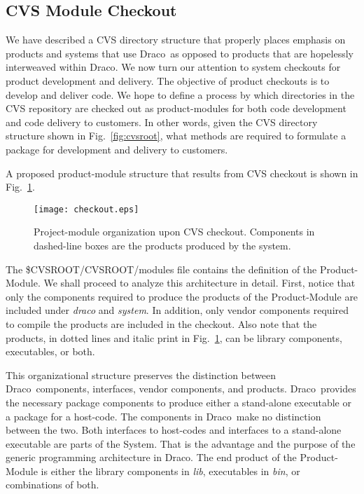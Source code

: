 \documentclass[11pt]{rnote}
\newcommand{\draco}{\textsf{Draco}}
\newcommand{\pkg}[1]{\textsf{#1}}
\newcommand{\dir}[1]{\textsl{#1}}
\begin{document}
\subsection{CVS Module Checkout}

We have described a CVS directory structure that properly places
emphasis on products and systems that use \draco\ as opposed to
products that are hopelessly interweaved within \draco.  We now turn
our attention to system checkouts for product development and
delivery.  The objective of product checkouts is to develop and
deliver code.  We hope to define a process by which directories in
the CVS repository are checked out as product-modules for both code
development and code delivery to customers.  In other words, given the
CVS directory structure shown in Fig.~\ref{fig:cvsroot}, what methods
are required to formulate a package for development and delivery to
customers.

A proposed product-module structure that results from CVS
checkout is shown in Fig.~\ref{fig:checkout}.
\begin{figure}
  \centerline{\texttt{[image: checkout.eps]}}
  \caption{Project-module organization upon CVS checkout.  Components
    in dashed-line boxes are the products produced by the system.}
  \label{fig:checkout}
\end{figure}
The \pkg{\$CVSROOT/CVSROOT/modules} file contains the definition of
the \pkg{Product-Module}.  We shall proceed to analyze this
architecture in detail.  First, notice that only the components
required to produce the products of the \pkg{Product-Module} are
included under \dir{draco} and \dir{system}.  In addition, only vendor
components required to compile the products are included in the
checkout.  Also note that the products, in dotted lines and italic
print in Fig.~\ref{fig:checkout}, can be library components,
executables, or both.

This organizational structure preserves the distinction between
\draco\ components, interfaces, vendor components, and products.
\draco\ provides the necessary package components to produce either a
stand-alone executable or a package for a host-code.  The components
in \draco\ make no distinction between the two.  Both interfaces to
host-codes and interfaces to a stand-alone executable are parts of the
\pkg{System}.  That is the advantage and the purpose of the generic
programming architecture in \draco.  The end product of the
\pkg{Product-Module} is either the library components in \dir{lib},
executables in \dir{bin}, or combinations of both.
\end{document}
